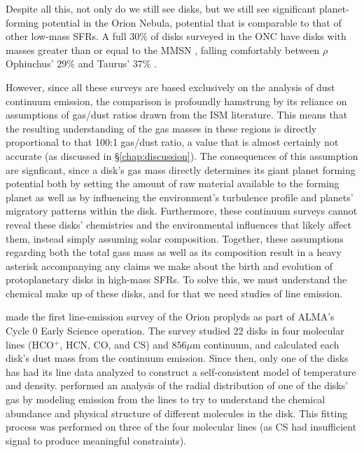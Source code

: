   
Despite all this, not only do we still see disks, but we still see significant planet-forming potential in the Orion Nebula, potential that is comparable to that of other low-mass SFRs. A full 30\% of disks surveyed in the ONC have disks with masses greater than or equal to the MMSN \citep{Mann2014}, falling comfortably between $\rho$ Ophiuchus' 29\% \cite{AndrewsWilliams2005} and Taurus' 37\% \citep{AndrewsWilliams2007}.


However, since all these surveys are based exclusively on the analysis of dust continuum emission, the comparison is profoundly hamstrung by its reliance on assumptions of gas/dust ratios drawn from the ISM literature. This means that the resulting understanding of the gas masses in these regions is directly proportional to that 100:1 gas/dust ratio, a value that is almost certainly not accurate (as discussed in \S\ref{chap:discussion}). The consequences of this assumption are signficant, since a disk's gas mass directly determines its giant planet forming potential both by setting the amount of raw material available to the forming planet as well as by influencing the environment's turbulence profile and planets' migratory patterns within the disk. Furthermore, these continuum surveys cannot reveal these disks' chemistries and the environmental influences that likely affect them, instead simply assuming solar composition. Together, these assumptions regarding both the total gass mass as well as its composition result in a heavy asterisk accompanying any claims we make about the birth and evolution of protoplanetary disks in high-mass SFRs. To solve this, we must understand the chemical make up of these disks, and for that we need studies of line emission.




\citet{Mann2014} made the first line-emission survey of the Orion proplyds as part of ALMA's Cycle 0 Early Science operation. The survey studied 22 disks in four molecular lines (HCO$^+$, HCN, CO, and CS) and $856 \mu$m continuum, and calculated each disk's dust mass from the continuum emission. Since then, only one of the disks has had its line data analyzed to construct a self-consistent model of temperature and density. \citet{Factor2017} performed an analysis of the radial distribution of one of the disks' gas by modeling emission from the lines to try to understand the chemical abundance and physical structure of different molecules in the disk. This fitting process was performed on three of the four molecular lines (as CS had insufficient signal to produce meaningful constraints).

